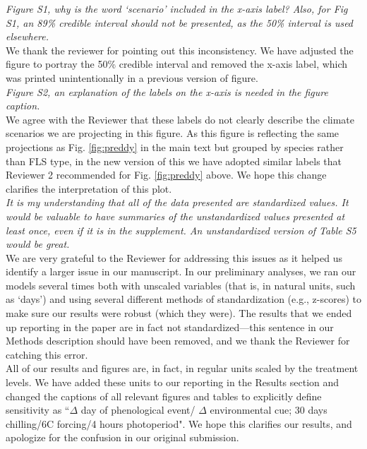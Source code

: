 \documentclass[11pt]{article}
\begin{document}
\emph{Figure S1, why is the word `scenario' included in the x-axis label? Also, for Fig S1, an 89\% credible interval should not be presented, as the 50\% interval is used elsewhere.}\\

\noident We thank the reviewer for pointing out this inconsistency. We have adjusted the figure to portray the 50\% credible interval and removed the x-axis label, which was printed unintentionally in a previous version of figure.\\

\emph{Figure S2, an explanation of the labels on the x-axis is needed in the figure caption.}\\

\noindent We agree with the Reviewer that these labels do not clearly describe the climate scenarios we are projecting in this figure. As this figure is reflecting the same projections as Fig. \ref{fig:preddy} in the main text but grouped by species rather than FLS type, in the new version of this we have adopted similar labels that Reviewer 2 recommended for Fig. \ref{fig:preddy} above. We hope this change clarifies the interpretation of this plot.\\


\emph{It is my understanding that all of the data presented are standardized values. It would be valuable to have summaries of the unstandardized values presented at least once, even if it is in the supplement. An unstandardized version of Table S5 would be great.}\\

\noindent We are very grateful to the Reviewer for addressing this issues as it helped us identify a larger issue in our manuscript. In our preliminary analyses, we ran our models several times both with unscaled variables (that is, in natural units, such as `days') and using several different methods of standardization (e.g., z-scores) to make sure our results were robust (which they were). The results that we ended up reporting in the paper are in fact not standardized---this sentence in our Methods description should have been removed, and we thank the Reviewer for catching this error.\\

\noindent All of our results and figures are, in fact, in regular units scaled by the treatment levels. We have added these units to our reporting in the Results section and changed the captions of all relevant figures and tables to explicitly define sensitivity as ``$\Delta$ day of phenological event/ $\Delta$ environmental cue; 30 days chilling/6\degree C forcing/4 hours photoperiod". We hope this clarifies our results, and apologize for the confusion in our original submission.\\ 
\end{document}
